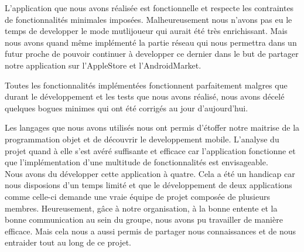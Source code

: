 L’application que nous avons réalisée est fonctionnelle et respecte les contraintes de fonctionnalités minimales imposées. Malheureusement nous n'avons pas eu le temps de developper le mode mutlijoueur  qui aurait été très enrichissant. Mais nous avons quand même implémenté la partie réseau qui  nous permettra dans un futur proche de pouvoir continuer à developper ce dernier dans le but de partager notre application sur l'AppleStore et l'AndroidMarket.

Toutes les fonctionnalités implémentées fonctionnent parfaitement malgres que durant le développement et les tests que nous avons réalisé, nous avons décelé quelques bogues minimes qui ont été corrigés au jour d’aujourd’hui.

Les langages que nous avons utilisés nous ont permis d'étoffer notre maitrise de la programmation objet et de découvrir le developpement mobile.
L'analyse du projet quand à elle s’est avéré suffisante et efficace car l’application fonctionne et que l’implémentation d’une multitude de fonctionnalités est envisageable.\\

Nous avons du développer cette application à quatre. Cela a été un handicap car nous disposions d’un temps limité et que le développement de deux applications comme celle-ci demande une vraie équipe de projet composée de plusieurs membres. Heureusement, gâce à notre organisation, à la bonne entente et la bonne communication au sein du groupe, nous avons pu travailler de manière efficace. Mais cela nous a aussi permis de partager nous connaissances et de nous entraider tout au long de ce projet.
